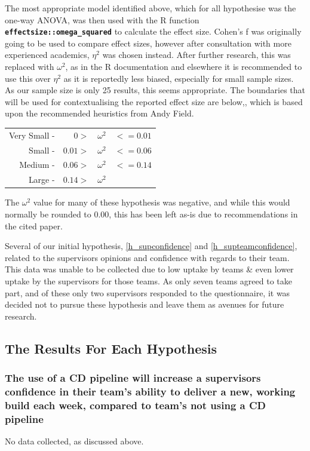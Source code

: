 \documentclass[journal]{IEEEtran}
\begin{document}
    The most appropriate model identified above, which for all hypothesise was the one-way ANOVA, was then used with the R function \textbf{\lstinline{effectsize::omega_squared}}\cite{RcohensfDocs} to calculate the effect size. Cohen's f was originally going to be used to compare effect sizes, however after consultation with more experienced academics, $\eta^2$ was chosen instead. After further research, this was replaced with $\omega^2$, as in the R documentation and elsewhere \cite{RcohensfDocs, statHowToOmegaSquared,ALBERS2018187} it is recommended to use this over $\eta^2$ as it is reportedly less biased, especially for small sample sizes\cite{ALBERS2018187}. As our sample size is only 25 results, this seems appropriate. The boundaries that will be used for contextualising the reported effect size are below,, which is based upon the recommended heuristics from Andy Field\cite{field2013discovering}.

    \begin{tabularx}{\linewidth}{r r c l}
        Very Small - & $0 > $ & $ \omega^2 $ & $<=0.01$ \\
        Small - & $0.01 > $ & $ \omega^2 $ & $<=0.06$ \\
        Medium - & $0.06 > $ & $ \omega^2 $ & $<=0.14$ \\
        Large - & $0.14 > $ & $ \omega^2 $ &  
    \end{tabularx}

    The $\omega^2$ value for many of these hypothesis was negative, and while this would normally be rounded to 0.00, this has been left as-is due to recommendations in the cited paper\cite{okada2017negative}.

    Several of our initial hypothesis, \ref{h_supconfidence} and \ref{h_supteamconfidence}, related to the supervisors opinions and confidence with regards to their team. This data was unable to be collected due to low uptake by teams \& even lower uptake by the supervisors for those teams. As only seven teams agreed to take part, and of these only two supervisors responded to the questionnaire, it was decided not to pursue these hypothesis and leave them as avenues for future research.
    \subsection*{The Results For Each Hypothesis}
        \subsubsection{The use of a CD pipeline will increase a supervisors confidence in their team's ability to deliver a new, working build each week, compared to team's not using a CD pipeline}
            No data collected, as discussed above. \\
\end{document}
